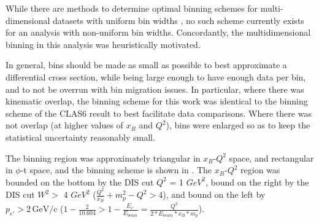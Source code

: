 
While there are methods to determine optimal binning schemes for multi-dimensional datasets with uniform bin widths \parencite{Knuth2019OptimalModels}, no such scheme currently exists for an analysis with non-uniform bin widths. Concordantly, the multidimensional binning in this analysis was heuristically motivated.


In general, bins should be made as small as possible to best approximate a differential cross section, while being large enough to have enough data per bin, and to not be overrun with bin migration issues. In particular, where there was kinematic overlap, the binning scheme for this work was identical to the binning scheme of the CLAS6 result \parencite{Bedlinskiy2014ExclusiveCLAS} to best facilitate data comparisons. Where there was not overlap (at higher values of $x_B$ and $Q^2$), bins were enlarged so as to keep the statistical uncertainty reasonably small. 


The binning region was approximately triangular in $x_B$-$Q^2$ space, and rectangular in $\phi$-t space, and the binning scheme is shown in . The $x_B$-$Q^2$ region was bounded on the bottom by the DIS cut $Q^2$ = 1 $GeV^2$, bound on the right by the DIS cut $W^2 > $ 4 $GeV^2$ ($\frac{Q^2}{x_B}+m_p^2-Q^2>4$), and bound on the left by $p_{e'} > 2 \, \text{GeV/c}$ ($1-\frac{2}{10.604} > 1-\frac{E_{e'}}{E_{beam}} = \frac{Q^2}{2*E_{beam}*x_B*m_p}$). 



